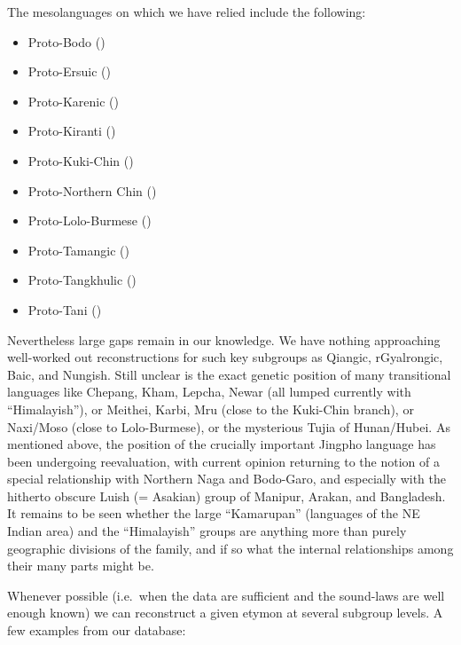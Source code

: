 The mesolanguages on which we have relied include the following:

\begin{itemize}[leftmargin=10pt,itemindent=-10pt]

\item Proto-Bodo (\citealt{RB-PB})
\item Proto-Ersuic (\citealt{DY-PE})
\item Proto-Karenic (\citealt{H-RKC,H-STK,RBJ-KLS,RB-PKR,TL-PK,DS-HPK,ST-HCBL})
\item Proto-Kiranti (\citealt{BM-PK7})
\item Proto-Kuki-Chin (\citealt{KVB-PKC})
\item Proto-Northern Chin (\citealt{CB-PNC})
\item Proto-Lolo-Burmese (\citealt{RB-PLB,JAM-LPLB,JAM-TSR,JAM-TJLB,JAM-MLBM,JAM-Quo,JAM-LDTB,JAM-PLBA,DB-PLolo})
\item Proto-Tamangic (\citealt{MM-K78,MM-Thesis})
\item Proto-Tangkhulic (\citealt{DRM-Tk})
\item Proto-Tani (\citealt{JS-HCST})

\end{itemize}

Nevertheless large gaps remain in our knowledge. We have nothing approaching  well-worked out reconstructions for such key subgroups as Qiangic, rGyalrongic, Baic, and Nungish. Still unclear is the exact genetic position of many transitional languages like Chepang, Kham, Lepcha, Newar (all lumped currently with “Himalayish”), or Meithei, Karbi, Mru (close to the Kuki-Chin branch), or Naxi/Moso (close to Lolo-Burmese), or the mysterious Tujia of Hunan/Hubei. As mentioned above, the position of the crucially important Jingpho language has been undergoing reevaluation, with current opinion returning to the notion of a special relationship with Northern Naga and Bodo-Garo, and especially with the hitherto obscure Luish (= Asakian) group of Manipur, Arakan, and Bangladesh. It remains to be seen whether the large “Kamarupan” (languages of the NE Indian area) and the “Himalayish” groups are anything more than purely geographic divisions of the family, and if so what the internal relationships among their many parts might be.

Whenever possible (i.e.\ when the data are sufficient and the sound-laws are well enough known) we can reconstruct a given etymon at several subgroup levels. A few examples from our database: 

